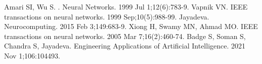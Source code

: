 \documentclass[11pt]{article}
\begin{document}
	
	
	\begin{thebibliography}{10}
            Amari SI, Wu S. 
            .
            \newblock Neural Networks. 1999 Jul 1;12(6):783-9.
            Vapnik VN. 
            \newblock IEEE transactions on neural networks. 1999 Sep;10(5):988-99.
            Jayadeva.  \newblock Neurocomputing. 2015 Feb 3;149:683-9.
            Xiong H, Swamy MN, Ahmad MO. \newblock IEEE transactions on neural networks. 2005 Mar
            7;16(2):460-74.
            Badge S, Soman S, Chandra S, Jayadeva. \newblock Engineering Applications of
            Artificial Intelligence. 2021 Nov 1;106:104493.
	\end{thebibliography}
	
	
	
\end{document}
